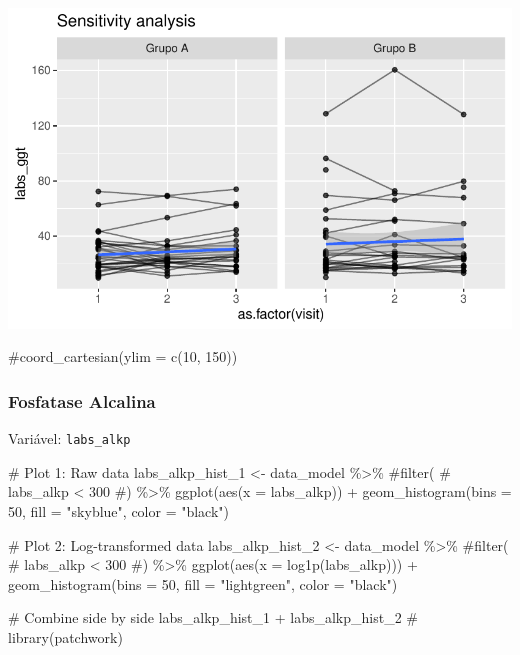 \documentclass[
  letterpaper,
  DIV=11,
  numbers=noendperiod]{scrartcl}
\newenvironment{Shaded}{\begin{snugshade}}{\end{snugshade}}
\newcommand{\AttributeTok}[1]{\textcolor[rgb]{0.40,0.45,0.13}{#1}}
\newcommand{\CommentTok}[1]{\textcolor[rgb]{0.37,0.37,0.37}{#1}}
\newcommand{\DecValTok}[1]{\textcolor[rgb]{0.68,0.00,0.00}{#1}}
\newcommand{\FunctionTok}[1]{\textcolor[rgb]{0.28,0.35,0.67}{#1}}
\newcommand{\NormalTok}[1]{\textcolor[rgb]{0.00,0.23,0.31}{#1}}
\newcommand{\OtherTok}[1]{\textcolor[rgb]{0.00,0.23,0.31}{#1}}
\newcommand{\SpecialCharTok}[1]{\textcolor[rgb]{0.37,0.37,0.37}{#1}}
\newcommand{\StringTok}[1]{\textcolor[rgb]{0.13,0.47,0.30}{#1}}
\begin{document}
\includegraphics{Outcomes_V1V2V3_files/figure-pdf/labs_ggt_6-2.pdf}

\begin{Shaded}
\begin{Highlighting}[]
    \CommentTok{\#coord\_cartesian(ylim = c(10, 150))}
\end{Highlighting}
\end{Shaded}

\subsubsection{Fosfatase Alcalina}\label{fosfatase-alcalina}

Variável: \texttt{labs\_alkp}

\begin{Shaded}
\begin{Highlighting}[]
\CommentTok{\# Plot 1: Raw data}
\NormalTok{labs\_alkp\_hist\_1 }\OtherTok{\textless{}{-}}\NormalTok{ data\_model }\SpecialCharTok{\%\textgreater{}\%} 
    \CommentTok{\#filter(}
    \CommentTok{\#    labs\_alkp \textless{} 300}
    \CommentTok{\#) \%\textgreater{}\% }
    \FunctionTok{ggplot}\NormalTok{(}\FunctionTok{aes}\NormalTok{(}\AttributeTok{x =}\NormalTok{ labs\_alkp)) }\SpecialCharTok{+} 
    \FunctionTok{geom\_histogram}\NormalTok{(}\AttributeTok{bins =} \DecValTok{50}\NormalTok{, }\AttributeTok{fill =} \StringTok{"skyblue"}\NormalTok{, }\AttributeTok{color =} \StringTok{"black"}\NormalTok{)}

\CommentTok{\# Plot 2: Log{-}transformed data}
\NormalTok{labs\_alkp\_hist\_2 }\OtherTok{\textless{}{-}}\NormalTok{ data\_model }\SpecialCharTok{\%\textgreater{}\%} 
    \CommentTok{\#filter(}
    \CommentTok{\#    labs\_alkp \textless{} 300}
    \CommentTok{\#) \%\textgreater{}\%}
    \FunctionTok{ggplot}\NormalTok{(}\FunctionTok{aes}\NormalTok{(}\AttributeTok{x =} \FunctionTok{log1p}\NormalTok{(labs\_alkp))) }\SpecialCharTok{+} 
    \FunctionTok{geom\_histogram}\NormalTok{(}\AttributeTok{bins =} \DecValTok{50}\NormalTok{, }\AttributeTok{fill =} \StringTok{"lightgreen"}\NormalTok{, }\AttributeTok{color =} \StringTok{"black"}\NormalTok{)}

\CommentTok{\# Combine side by side}
\NormalTok{labs\_alkp\_hist\_1 }\SpecialCharTok{+}\NormalTok{ labs\_alkp\_hist\_2 }\CommentTok{\# library(patchwork)}
\end{Highlighting}
\end{Shaded}
\end{document}
